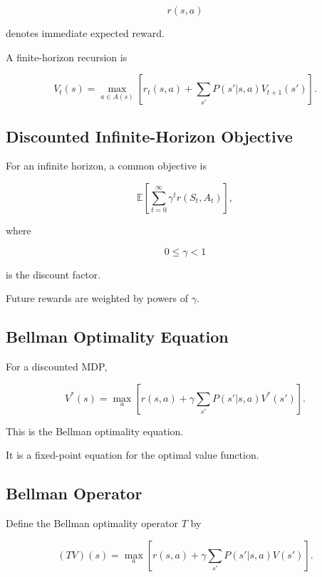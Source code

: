 \[
r(s,a)
\]

denotes immediate expected reward.

A finite-horizon recursion is

\[
\boxed{
V_t(s)
=
\max_{a\in A(s)}
\left[
r_t(s,a)
+
\sum_{s'}
P(s'|s,a)
V_{t+1}(s')
\right].
}
\]

\subsection{Discounted Infinite-Horizon Objective}
\label{subsec:discounted-infinite-horizon}

For an infinite horizon, a common objective is

\[
\boxed{
\mathbb{E}
\left[
\sum_{t=0}^{\infty}
\gamma^t
r(S_t,A_t)
\right],
}
\]

where

\[
\boxed{
0\leq\gamma<1
}
\]

is the discount factor.

Future rewards are weighted by powers of \(\gamma\).

\subsection{Bellman Optimality Equation}
\label{subsec:bellman-optimality-equation}

For a discounted MDP,

\[
\boxed{
V^*(s)
=
\max_{a}
\left[
r(s,a)
+
\gamma
\sum_{s'}
P(s'|s,a)
V^*(s')
\right].
}
\]

This is the Bellman optimality equation.

It is a fixed-point equation for the optimal value function.

\subsection{Bellman Operator}
\label{subsec:bellman-operator}

Define the Bellman optimality operator \(T\) by

\[
\boxed{
(TV)(s)
=
\max_a
\left[
r(s,a)
+
\gamma
\sum_{s'}
P(s'|s,a)
V(s')
\right].
}
\]

